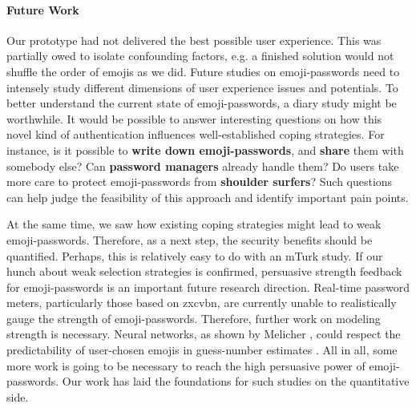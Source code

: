 \paragraph{Future Work}
Our prototype had not delivered the best possible user experience. This was partially owed to isolate confounding factors, e.g. a finished solution would not shuffle the order of emojis as we did. Future studies on emoji-passwords need to intensely study different dimensions of user experience issues and potentials. To better understand the current state of emoji-passwords, a diary study might be worthwhile. It would be possible to answer interesting questions on how this novel kind of authentication influences well-established coping strategies. For instance, is it possible to \textbf{write down emoji-passwords}, and \textbf{share} them with somebody else? Can \textbf{password managers} already handle them?  Do users take more care to protect emoji-passwords from \textbf{shoulder surfers}? Such questions can help judge the feasibility of this approach and identify important pain points.

At the same time, we saw how existing coping strategies might lead to weak emoji-passwords. Therefore, as a next step, the security benefits should be quantified. Perhaps, this is relatively easy to do with an \gls{mTurk} study. If our hunch about weak selection strategies is confirmed, persuasive strength feedback for emoji-passwords is an important future research direction. Real-time password meters, particularly those based on zxcvbn, are currently unable to realistically gauge the strength of emoji-passwords. Therefore, further work on modeling strength is necessary. Neural networks, as shown by Melicher \etal, could respect the predictability of user-chosen emojis in guess-number estimates \cite{Melicher2016NeuralNetworks}. All in all, some more work is going to be necessary to reach the high persuasive power of emoji-passwords. Our work has laid the foundations for such studies on the quantitative side. 

